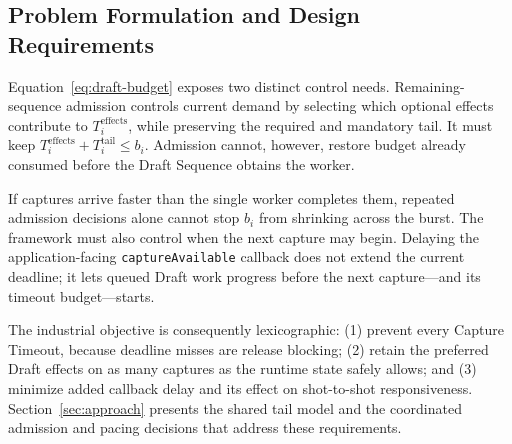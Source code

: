 \subsection{Problem Formulation and Design Requirements}
\label{sec:control-problem}

Equation~\ref{eq:draft-budget} exposes two distinct control needs.
Remaining-sequence admission controls current demand by
selecting which optional effects contribute to $T_i^{\mathrm{effects}}$, while
preserving the required and mandatory tail. It must keep
$T_i^{\mathrm{effects}}+T_i^{\mathrm{tail}}\leq b_i$. Admission cannot,
however, restore budget already consumed before the Draft Sequence obtains the
worker.

If captures arrive faster than the single worker completes them, repeated
admission decisions alone cannot stop $b_i$ from shrinking across the
burst. The framework must also control when the next capture may begin.
Delaying the application-facing \texttt{captureAvailable} callback does not
extend the current deadline; it lets queued Draft work progress before the next
capture---and its timeout budget---starts.

The industrial objective is consequently lexicographic: (1) prevent every
Capture Timeout, because deadline misses are release blocking; (2) retain the
preferred Draft effects on as many captures as the runtime state safely allows;
and (3) minimize added callback delay and its effect on shot-to-shot
responsiveness. Section~\ref{sec:approach} presents the shared tail model and
the coordinated admission and pacing decisions that address these requirements.
